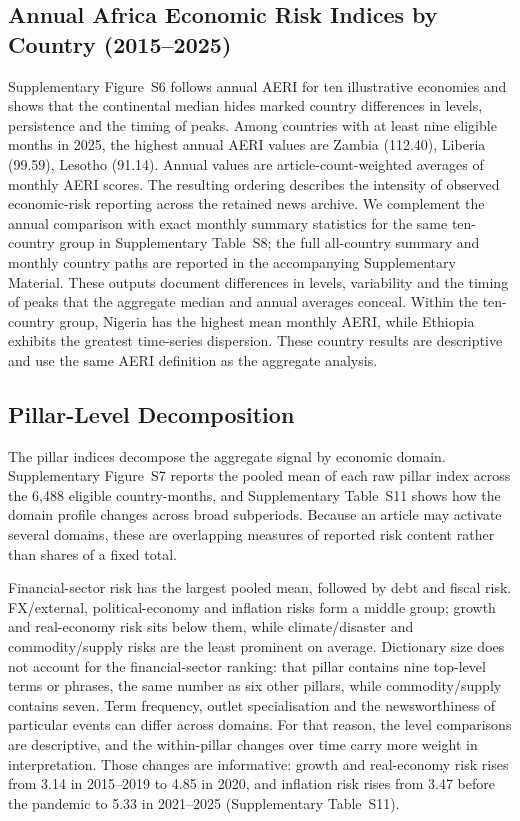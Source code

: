 \documentclass[12pt]{article}
\begin{document}
\subsection{Annual Africa Economic Risk Indices by Country (2015--2025)}\label{sec:aeri_heatmap}
Supplementary Figure~S6 follows annual AERI for ten illustrative economies and shows that the continental median hides marked country differences in levels, persistence and the timing of peaks.
Among countries with at least nine eligible months in 2025, the highest annual AERI values are Zambia (112.40), Liberia (99.59), Lesotho (91.14). Annual values are article-count-weighted averages of monthly AERI scores. The resulting ordering describes the intensity of observed economic-risk reporting across the retained news archive.
We complement the annual comparison with exact monthly summary statistics for the same ten-country group in Supplementary Table~S8; the full all-country summary and monthly country paths are reported in the accompanying Supplementary Material. These outputs document differences in levels, variability and the timing of peaks that the aggregate median and annual averages conceal. Within the ten-country group, Nigeria has the highest mean monthly AERI, while Ethiopia exhibits the greatest time-series dispersion. These country results are descriptive and use the same AERI definition as the aggregate analysis.


\subsection{Pillar-Level Decomposition}\label{sec:pillar_results}
The pillar indices decompose the aggregate signal by economic domain. Supplementary Figure~S7 reports the pooled mean of each raw pillar index across the 6,488 eligible country-months, and Supplementary Table~S11 shows how the domain profile changes across broad subperiods. Because an article may activate several domains, these are overlapping measures of reported risk content rather than shares of a fixed total.

Financial-sector risk has the largest pooled mean, followed by debt and fiscal risk. FX/external, political-economy and inflation risks form a middle group; growth and real-economy risk sits below them, while climate/disaster and commodity/supply risks are the least prominent on average. Dictionary size does not account for the financial-sector ranking: that pillar contains nine top-level terms or phrases, the same number as six other pillars, while commodity/supply contains seven. Term frequency, outlet specialisation and the newsworthiness of particular events can differ across domains. For that reason, the level comparisons are descriptive, and the within-pillar changes over time carry more weight in interpretation. Those changes are informative: growth and real-economy risk rises from 3.14 in 2015--2019 to 4.85 in 2020, and inflation risk rises from 3.47 before the pandemic to 5.33 in 2021--2025 (Supplementary Table~S11).
\end{document}

